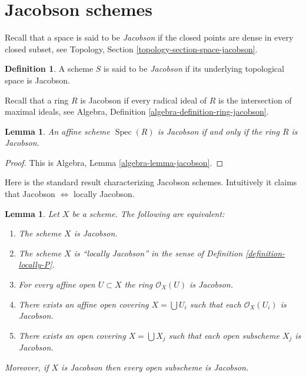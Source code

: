 \documentclass{stacks-project}
\theoremstyle{plain}
\newtheorem{lemma}[subsection]{Lemma}
\theoremstyle{definition}
\newtheorem{definition}[subsection]{Definition}
\theoremstyle{remark}
\numberwithin{equation}{subsection}
\def\Spec{\mathop{\mathrm{Spec}}}
\begin{document}
\section{Jacobson schemes}
\label{section-jacobson}

\noindent
Recall that a space is said to be {\it Jacobson} if the closed points are
dense in every closed subset, see
Topology, Section \ref{topology-section-space-jacobson}.

\begin{definition}
\label{definition-jacobson}
A scheme $S$ is said to be {\it Jacobson} if its underlying topological
space is Jacobson.
\end{definition}

\noindent
Recall that a ring $R$ is Jacobson if every radical ideal of $R$
is the intersection of maximal ideals, see
Algebra, Definition \ref{algebra-definition-ring-jacobson}.

\begin{lemma}
\label{lemma-affine-jacobson}
An affine scheme $\Spec(R)$ is Jacobson if and only if
the ring $R$ is Jacobson.
\end{lemma}

\begin{proof}
This is Algebra, Lemma \ref{algebra-lemma-jacobson}.
\end{proof}

\noindent
Here is the standard result characterizing Jacobson schemes.
Intuitively it claims that Jacobson $\Leftrightarrow$ locally Jacobson.

\begin{lemma}
\label{lemma-locally-jacobson}
Let $X$ be a scheme. The following are equivalent:
\begin{enumerate}
\item The scheme $X$ is Jacobson.
\item The scheme $X$ is ``locally Jacobson'' in the sense of
Definition \ref{definition-locally-P}.
\item For every affine open $U \subset X$ the ring $\mathcal{O}_X(U)$
is Jacobson.
\item There exists an affine open covering $X = \bigcup U_i$ such that
each $\mathcal{O}_X(U_i)$ is Jacobson.
\item There exists an open covering $X = \bigcup X_j$
such that each open subscheme $X_j$ is Jacobson.
\end{enumerate}
Moreover, if $X$ is Jacobson then every open subscheme
is Jacobson.
\end{lemma}
\end{document}
